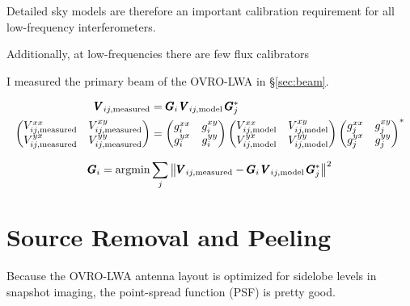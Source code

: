 \begin{bibunit}
Detailed sky models are therefore an important calibration requirement for all low-frequency
interferometers.



Additionally, at low-frequencies there are few flux calibrators



I measured the primary beam of the OVRO-LWA in \S\ref{sec:beam}.






\begin{align}
    \pmb V_{ij, \text{measured}} &= \pmb G_i \, \pmb V_{ij, \text{model}} \, \pmb G_j^* \\
    \begin{pmatrix}
        V_{ij, \text{measured}}^{xx} & V_{ij, \text{measured}}^{xy} \\
        V_{ij, \text{measured}}^{yx} & V_{ij, \text{measured}}^{yy} \\
    \end{pmatrix} &=
    \begin{pmatrix}
        g_{i}^{xx} & g_{i}^{xy} \\
        g_{i}^{yx} & g_{i}^{yy} \\
    \end{pmatrix}
    \begin{pmatrix}
        V_{ij, \text{model}}^{xx} & V_{ij, \text{model}}^{xy} \\
        V_{ij, \text{model}}^{yx} & V_{ij, \text{model}}^{yy} \\
    \end{pmatrix}
    \begin{pmatrix}
        g_{j}^{xx} & g_{j}^{xy} \\
        g_{j}^{yx} & g_{j}^{yy} \\
    \end{pmatrix}^*
\end{align}




\begin{equation}
    \pmb G_i = \operatorname{argmin} \sum_j
        \left\|
            \pmb V_{ij, \text{measured}} - \pmb G_i \, \pmb V_{ij, \text{model}} \, \pmb G_j^*
        \right\|^2
\end{equation}

\section{Source Removal and Peeling}

Because the OVRO-LWA antenna layout is optimized for sidelobe levels in snapshot imaging, the
point-spread function (PSF) is pretty good.

\end{bibunit}

